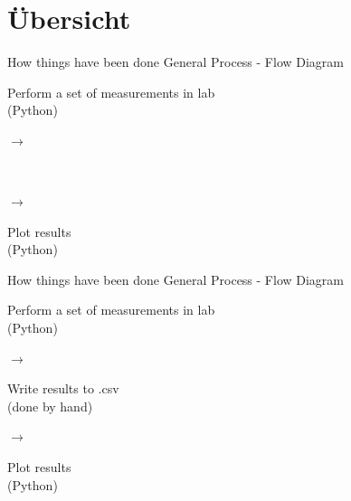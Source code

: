 
\section{Übersicht}

\begin{frame}{How things have been done}
    \centering
    \Large{General Process - Flow Diagram}\\[2cm]
    \normalsize
    \begin{minipage}{.3\textwidth}
	\centering
	Perform a set of measurements in lab\\
	(Python)
    \end{minipage}
    \begin{minipage}{.02\textwidth}
	\centering
	$\rightarrow$
    \end{minipage}
    \pause
    \begin{minipage}{.3\textwidth}
	\
    \end{minipage}
    \begin{minipage}{.02\textwidth}
	\centering
	$\rightarrow$
    \end{minipage}
    \begin{minipage}{.3\textwidth}
    \centering
    Plot results\\
    (Python)
    \end{minipage}
\end{frame}


\begin{frame}{How things have been done}
    \centering
    \Large{General Process - Flow Diagram}\\[2cm]
    \normalsize
    \begin{minipage}{.3\textwidth}
	\centering
	Perform a set of measurements in lab \\
	(Python)
    \end{minipage}
    \begin{minipage}{.02\textwidth}
	\centering
	$\rightarrow$
    \end{minipage}
    \begin{minipage}{.3\textwidth}
	\centering
	Write results to .csv \\
	(done by hand)
    \end{minipage}
    \begin{minipage}{.02\textwidth}
	\centering
	$\rightarrow$
    \end{minipage}
    \begin{minipage}{.3\textwidth}
    \centering
    Plot results\\
    (Python)
    \end{minipage}
\end{frame}

